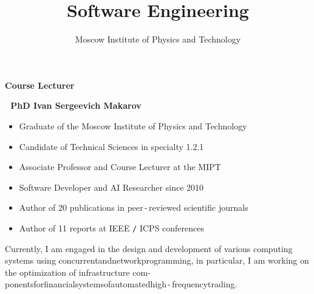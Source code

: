 \documentclass{beamer}
\begin{document}
\title{\bf Software Engineering} 

\author{Moscow Institute of Physics and Technology}

\date{}

\frame{\titlepage}



\begin{frame}{\bf Course Lecturer}

    \textbf{\;\;\;\;\,\,\,\,PhD Ivan Sergeevich Makarov}

    \bigskip
    
    \begin{itemize}

        \item Graduate of the Moscow Institute of Physics and Technology

        \item Candidate of Technical Sciences in specialty 1.2.1

        \item Associate Professor and Course Lecturer at the MIPT

        \item Software Developer and AI Researcher since 2010

        \item Author of 20 publications in peer\,-\,reviewed scientific journals
    
        \item Author of 11 reports at IEEE \texttt{/} ICPS conferences
        
    \end{itemize}

    \begin{block}
    \justifying Currently, I am engaged in the design and development of various computing systems using concurrent\:and\:network\:programming, in particular, I am working on the optimization of infrastructure com- ponents\;for\;financial\;systems\;of\;automated\;high\,-\,frequency\;trading.
    \end{block}
    
\end{frame}
\end{document}
